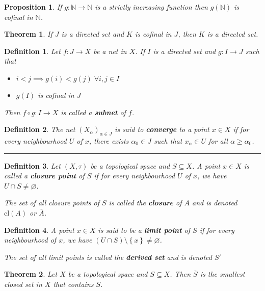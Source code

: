 \documentclass[14pt,twoside]{extreport}
\newcommand{\hhrule}{\vspace{1cm}\hrule\vspace{1cm}}
\newtheorem*{defn}{Definition}
\newtheorem*{thm}{Theorem}
\newtheorem*{prop}{Proposition}
\begin{document}
\begin{prop}
    If $g \colon \mathbb{N} \to \mathbb{N}$ is a strictly increasing function then $g\left (\mathbb{N}\right )$ is cofinal in $\mathbb{N}$.
\end{prop}

\begin{thm}
    If $J$ is a directed set and $K$ is cofinal in $J$, then $K$ is a directed set.
\end{thm}

\begin{defn}
    Let $f \colon J \to X$ be a net in $X$. If $I$ is a directed set and $g \colon I \to J$ such that
    \begin{itemize}
        \item $i < j \implies g\left (i\right ) < g\left (j\right ) \;\forall i, j \in I$
        \item $g\left (I\right )$ is cofinal in $J$
    \end{itemize}
    Then $f \circ g \colon I \to X$ is called a \textbf{subnet} of $f$.
\end{defn}

\begin{defn}
    The net $\left (X_\alpha\right )_{\alpha \in J}$ is said to \textbf{converge} to a point $x \in X$ if for every neighbourhood $U$ of $x$, there exists $\alpha_0 \in J$ such that $x_\alpha \in U$ for all $\alpha \geq \alpha_0$.
\end{defn}

\hhrule 

\begin{defn}
    Let $\left (X, \tau\right )$ be a topological space and $S \subseteq X$. A point $x \in X$ is called a \textbf{closure point} of $S$ if for every neighbourhood $U$ of $x$, we have $U \cap S \neq  \varnothing$.

    The set of all closure points of $S$ is called the \textbf{closure} of $A$ and is denoted $\text{cl}\left (A\right )$ or $\bar{A}$.
\end{defn}

\begin{defn}
    A point $x \in X$ is said to be a \textbf{limit point} of $S$ if for every neighbourhood of $x$, we have $\left (U \cap S\right ) \setminus \left\{ x \right\} \neq  \varnothing $.

    The set of all limit points is called the \textbf{derived set} and is denoted $S'$
\end{defn}

\begin{thm}
    Let $X$ be a topological space and $S \subseteq X$. Then $\bar{S}$ is the smallest closed set in $X$ that contains $S$.
\end{thm}
\end{document}
